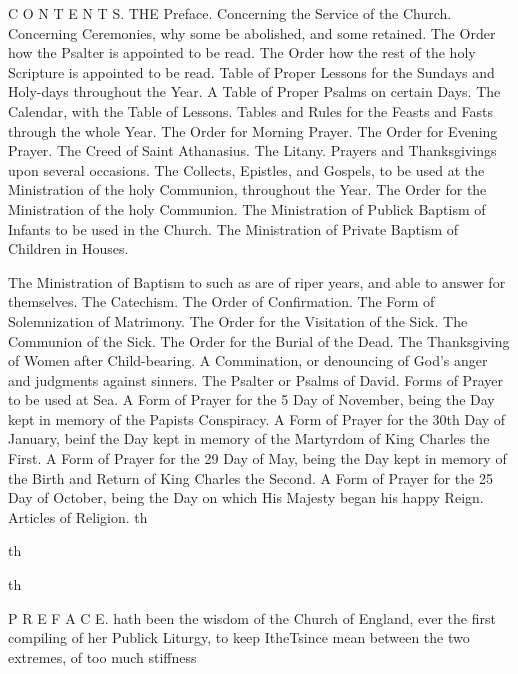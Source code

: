 C O N T E N T S. THE Preface. Concerning the Service of the Church. Concerning Ceremonies, why some be abolished, and some retained. The Order how the Psalter is appointed to be read. The Order how the rest of the holy Scripture is appointed to be read. Table of Proper Lessons for the Sundays and Holy-days throughout the Year. A Table of Proper Psalms on certain Days. The Calendar, with the Table of Lessons. Tables and Rules for the Feasts and Fasts through the whole Year. The Order for Morning Prayer. The Order for Evening Prayer. The Creed of Saint Athanasius. The Litany. Prayers and Thanksgivings upon several occasions. The Collects, Epistles, and Gospels, to be used at the Ministration of the holy Communion, throughout the Year. The Order for the Ministration of the holy Communion. The Ministration of Publick Baptism of Infants to be used in the Church. The Ministration of Private Baptism of Children in Houses.

The Ministration of Baptism to such as are of riper years, and able to answer for themselves. The Catechism. The Order of Confirmation. The Form of Solemnization of Matrimony. The Order for the Visitation of the Sick. The Communion of the Sick. The Order for the Burial of the Dead. The Thanksgiving of Women after Child-bearing. A Commination, or denouncing of God’s anger and judgments against sinners. The Psalter or Psalms of David. Forms of Prayer to be used at Sea. A Form of Prayer for the 5 Day of November, being the Day kept in memory of the Papists Conspiracy. A Form of Prayer for the 30th Day of January, beinf the Day kept in memory of the Martyrdom of King Charles the First. A Form of Prayer for the 29 Day of May, being the Day kept in memory of the Birth and Return of King Charles the Second. A Form of Prayer for the 25 Day of October, being the Day on which His Majesty began his happy Reign. Articles of Religion. th

th

th

P R E F A C E. hath been the wisdom of the Church of England, ever the first compiling of her Publick Liturgy, to keep ItheTsince mean between the two extremes, of too much stiffness

